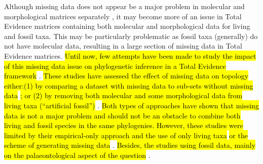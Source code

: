\documentclass[12pt,letterpaper]{article}
\begin{document}
Although missing data does not appear be a major problem in molecular and morphological matrices separately \citep[\hl{as long as enough data overlaps in each case, and missing data are not phylogeneticaly biased;}][]{wiensmissing2003,Wiens01102005,wiensmissing2006,wiensmissing2008,lemmonthe2009,Sanderson22072011,rouresite-specific2011,pattinsonphylogeny2014}, it may become more of an issue in Total Evidence matrices containing both molecular and morphological data for living and fossil taxa.
This may be particularly problematic as fossil taxa (generally) do not have molecular data, resulting in a large section of missing data in Total Evidence matrices.
\hl{Until now, few attempts have been made to study the impact of this missing data issue on phylogenetic inference in a Total Evidence framework }\citep[\hl{i.e. using both molecular and morphological data; e.g.}][]{Wiens01102005,manosphylogeny2007,pattinsonphylogeny2014}.
\hl{These studies have assessed the effect of missing data on topology either:(1) by comparing a dataset with missing data to sub-sets without missing data }\citep{Wiens01102005}\hl{; or (2) by removing both molecular and some morphological data from living taxa (``artificial fossil'') }\citep{manosphylogeny2007,pattinsonphylogeny2014}.
\hl{Both types of approaches have shown that missing data is not a major problem and should not be an obstacle to combine both living and fossil species in the same phylogenies.
However, these studies were limited by their empirical-only approach and the use of only living taxa }\citep{Wiens01102005}\hl{ or the scheme of generating missing data }\citep[\hl{i.e. using the patterns from the fossil record;}][]{manosphylogeny2007,pattinsonphylogeny2014}.
\hl{Besides, the studies using fossil data, mainly on the palaeontological aspect of the question }\citep[\hl{i.e. the effect of missing data in fossils in Total Evidence matrices;}][]{manosphylogeny2007,pattinsonphylogeny2014}.
\end{document}
